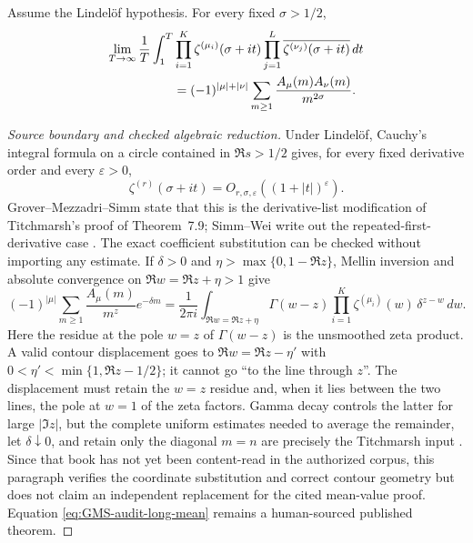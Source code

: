 \begin{lemma}
\label{lem:GMS-audit-long-mean}
Assume the Lindel\"of hypothesis.  For every fixed $\sigma>1/2$,
\begin{align}
 \lim_{T\to\infty}\frac1T\int_1^T
 &\prod_{i=1}^{K}\zeta^{(\mu_i)}(\sigma+it)
 \prod_{j=1}^{L}\overline{\zeta^{(\nu_j)}(\sigma+it)}\,dt\notag\\
 &=(-1)^{|\mu|+|\nu|}
 \sum_{m\geq1}\frac{A_\mu(m)A_\nu(m)}{m^{2\sigma}}.
 \label{eq:GMS-audit-long-mean}
\end{align}
\end{lemma}

\begin{proof}[Source boundary and checked algebraic reduction]
Under Lindel\"of, Cauchy's integral formula on a circle contained in
$\Re s>1/2$ gives, for every fixed derivative order and every $\varepsilon>0$,
\begin{equation}
 \zeta^{(r)}(\sigma+it)=O_{r,\sigma,\varepsilon}((1+|t|)^\varepsilon).
 \label{eq:GMS-audit-LH-derivative-bound}
\end{equation}
Grover--Mezzadri--Simm state that this is the derivative-list modification of Titchmarsh's
proof of Theorem~7.9; Simm--Wei write out the repeated-first-derivative case
\cite[Sec.~3, especially the proof following their eq.~(3.20)]{simmWei2026}.  The exact
coefficient substitution can be checked without importing any estimate.  If $\delta>0$ and
$\eta>\max\{0,1-\Re z\}$, Mellin inversion and absolute convergence on
$\Re w=\Re z+\eta>1$ give
\begin{equation}
 (-1)^{|\mu|}\sum_{m\geq1}\frac{A_\mu(m)}{m^z}e^{-\delta m}
 =\frac1{2\pi i}\int_{\Re w=\Re z+\eta}
 \Gamma(w-z)\prod_{i=1}^{K}\zeta^{(\mu_i)}(w)\,
 \delta^{z-w}\,dw.
 \label{eq:GMS-audit-smoothed-Mellin}
\end{equation}
Here the residue at the pole $w=z$ of $\Gamma(w-z)$ is the unsmoothed zeta product.  A valid
contour displacement goes to $\Re w=\Re z-\eta'$ with
$0<\eta'<\min\{1,\Re z-1/2\}$; it cannot go ``to the line through $z$''.  The displacement
must retain the $w=z$ residue and, when it lies between the two lines, the pole at $w=1$ of
the zeta factors.  Gamma decay controls the latter for large $|\Im z|$, but the complete
uniform estimates needed to average the remainder, let $\delta\downarrow0$, and retain only
the diagonal $m=n$ are precisely the Titchmarsh input
\cite[Chs.~VII and XIII]{titchmarsh1986}.  Since that book has not yet been content-read in
the authorized corpus, this paragraph verifies the coordinate substitution and correct
contour geometry but does not claim an independent replacement for the cited mean-value
proof.  Equation \eqref{eq:GMS-audit-long-mean} remains a human-sourced published theorem.
\end{proof}

